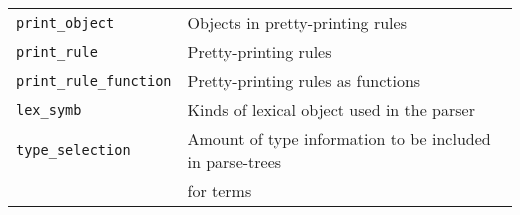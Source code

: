 {\begin{center}
\begin{tabular}{|l|l|}
{\small\tt print\_object}         & Objects in pretty-printing rules \\
{\small\tt print\_rule}           & Pretty-printing rules \\
{\small\tt print\_rule\_function} & Pretty-printing rules as functions \\
\hline
{\small\tt lex\_symb}             & Kinds of lexical object used in the parser
\\
\hline
{\small\tt type\_selection}       & Amount of type information to be included
in parse-trees \\
                                  & for terms \\
\hline
\end{tabular}
\end{center}

}
